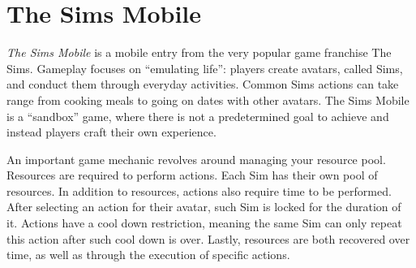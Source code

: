 \documentclass[letterpaper]{article} %
\begin{document}
\section{The Sims Mobile}


{\em The Sims Mobile} is a mobile entry from the very popular game franchise The Sims. Gameplay focuses on ``emulating life'': players create avatars, called Sims, and conduct them through everyday activities. Common Sims actions can take range from cooking meals to going on dates with other avatars. The Sims Mobile is a ``sandbox'' game, where there is not a predetermined goal to achieve and instead players craft their own experience.


An important game mechanic revolves around managing your resource pool. Resources are required to perform actions. Each Sim has their own pool of resources. In addition to resources, actions also require time to be performed. After selecting an action for their avatar, such Sim is locked for the duration of it. Actions have a cool down restriction, meaning the same Sim can only repeat this action after such cool down is over. Lastly, resources are both recovered over time, as well as through the execution of specific actions.
\end{document}
